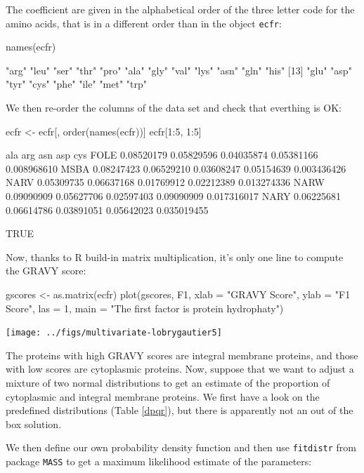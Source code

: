 \documentclass{article}
\begin{document}
The coefficient are given in the alphabetical order of the three letter code for
the amino acids, that is in a different order than in the object \texttt{ecfr}:

\begin{Schunk}
\begin{Sinput}
 names(ecfr)
\end{Sinput}
\begin{Soutput}
 [1] "arg" "leu" "ser" "thr" "pro" "ala" "gly" "val" "lys" "asn" "gln" "his"
[13] "glu" "asp" "tyr" "cys" "phe" "ile" "met" "trp"
\end{Soutput}
\end{Schunk}

We then re-order the columns of the data set and check that everthing is OK:

\begin{Schunk}
\begin{Sinput}
 ecfr <- ecfr[, order(names(ecfr))]
 ecfr[1:5, 1:5]
\end{Sinput}
\begin{Soutput}
            ala        arg        asn        asp         cys
FOLE 0.08520179 0.05829596 0.04035874 0.05381166 0.008968610
MSBA 0.08247423 0.06529210 0.03608247 0.05154639 0.003436426
NARV 0.05309735 0.06637168 0.01769912 0.02212389 0.013274336
NARW 0.09090909 0.05627706 0.02597403 0.09090909 0.017316017
NARY 0.06225681 0.06614786 0.03891051 0.05642023 0.035019455
\end{Soutput}
\begin{Soutput}
[1] TRUE
\end{Soutput}
\end{Schunk}

Now, thanks to R build-in matrix multiplication, it's only one line to compute
the GRAVY score:

\begin{Schunk}
\begin{Sinput}
 gscores <- as.matrix(ecfr) %
 plot(gscores, F1, xlab = "GRAVY Score", ylab = "F1 Score", 
     las = 1, main = "The first factor is protein hydrophaty")
\end{Sinput}
\end{Schunk}
\texttt{[image: ../figs/multivariate-lobrygautier5]}

The proteins with high GRAVY scores are integral membrane proteins, and those
with low scores are cytoplasmic proteins. Now, suppose that we want to adjust
a mixture of two normal distributions to get an estimate of the proportion of
cytoplasmic and integral membrane proteins. We first have a look on the predefined
distributions (Table \ref{dpqr}), but there is apparently not an out of the box
solution.

We then define our own probability density function and then use \texttt{fitdistr} from package
\texttt{MASS} to get a maximum likelihood estimate of the parameters:
\end{document}
